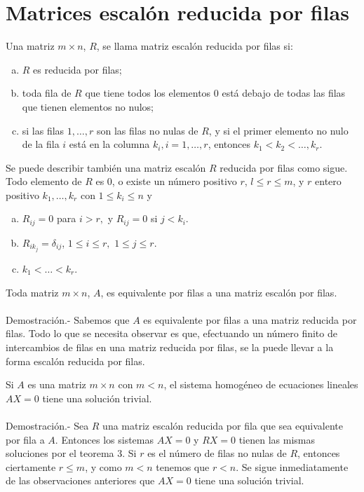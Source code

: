 \section{Matrices escalón reducida por filas}

    \begin{def.}
	Una matriz $m\times n$, $R$, se llama matriz escalón reducida por filas si:
	\begin{enumerate}[(a)]
	    \item $R$ es reducida por filas;
	    \item toda fila de $R$ que tiene todos los elementos $0$ está debajo de todas las filas que tienen elementos no nulos;
	    \item si las filas $1,\ldots, r$ son las filas no nulas de $R$, y si el primer elemento no nulo de la fila $i$ está en la columna $k_i, i=1,\ldots, r$, entonces $k_1<k_2<\ldots,k_r.$
	\end{enumerate}
	Se puede describir también una matriz escalón $R$ reducida por filas como sigue. Todo elemento de $R$ es $0$, o existe un número positivo $r$, $l\leq r \leq m$, y $r$ entero positivo $k_1,\ldots ,k_r$ con $1\leq k_i\leq n$ y
	\begin{enumerate}[(a)]
	    \item $R_{ij}=0$ para $i>r,$ y $R_{ij}=0$ si $j<k_i$.
	    \item $R_{ik_j}=\delta_{ij}$, $1\leq i \leq r,$ $1\leq j\leq r$.
	    \item $k_1<\ldots < k_r$.
	\end{enumerate}
    \end{def.}

\begin{teo}
    Toda matriz $m\times n$, $A$, es equivalente por filas a una matriz escalón por filas.\\\\
	Demostración.-\; Sabemos que $A$ es equivalente por filas a una matriz reducida por filas. Todo lo que se necesita observar es que, efectuando un número finito de intercambios de filas en una matriz reducida por filas, se la puede llevar a la forma escalón reducida por filas.
\end{teo}

\begin{teo}
    Si $A$ es una matriz $m\times n$ con $m<n$, el sistema homogéneo de ecuaciones lineales $AX=0$ tiene una solución trivial.\\\\
	Demostración.-\; Sea $R$ una matriz escalón reducida por fila que sea equivalente por fila a $A$. Entonces los sistemas $AX=0$ y $RX=0$ tienen las mismas soluciones por el teorema 3. Si $r$ es el número de filas no nulas de $R$, entonces ciertamente $r\leq m$, y como $m<n$ tenemos que $r<n$. Se sigue inmediatamente de las observaciones anteriores que $AX=0$ tiene una solución trivial.
\end{teo}

